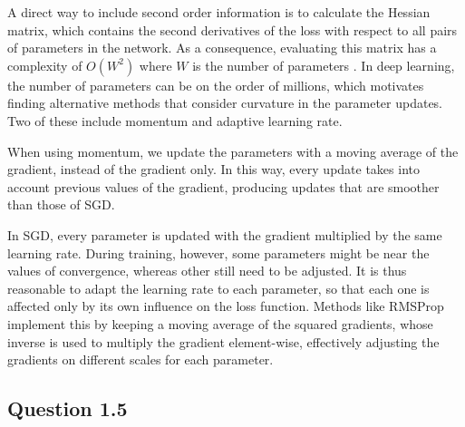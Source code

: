 \documentclass{article}
\begin{document}
A direct way to include second order information is to calculate the Hessian matrix, which contains the second derivatives of the loss with respect to all pairs of parameters in the network. As a consequence, evaluating this matrix has a complexity of $O(W^2)$ where $W$ is the number of parameters \cite{bishop2006pattern}. In deep learning, the number of parameters can be on the order of millions, which motivates finding alternative methods that consider curvature in the parameter updates. Two of these include momentum and adaptive learning rate.

When using momentum, we update the parameters with a moving average of the gradient, instead of the gradient only. In this way, every update takes into account previous values of the gradient, producing updates that are smoother than those of SGD.

In SGD, every parameter is updated with the gradient multiplied by the same learning rate. During training, however, some parameters might be near the values of convergence, whereas other still need to be adjusted. It is thus reasonable to adapt the learning rate to each parameter, so that each one is affected only by its own influence on the loss function. Methods like RMSProp implement this by keeping a moving average of the squared gradients, whose inverse is used to multiply the gradient element-wise, effectively adjusting the gradients on different scales for each parameter.

\subsection*{Question 1.5}
\end{document}
